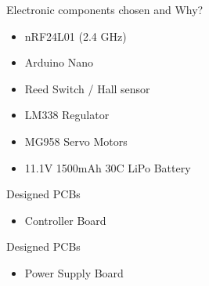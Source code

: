 \documentclass[10pt, a4paper]{beamer}
\begin{document}
\begin{frame}{Electronic components chosen and Why?}
\centering
\begin{itemize}
\setlength\itemsep{1em}
    \item nRF24L01 (2.4 GHz)
    \item Arduino Nano
    \item Reed Switch / Hall sensor
    \item LM338 Regulator
    \item MG958 Servo Motors
    \item 11.1V 1500mAh 30C LiPo Battery
    
    \end{itemize}
\end{frame}

\begin{frame}{Designed PCBs}
\begin{itemize}
    \item Controller Board
    \end{itemize}
\centering
{}	
\end{frame}

\begin{frame}{Designed PCBs}
\begin{itemize}
    \item Power Supply Board
    \end{itemize}
\centering
{}	
\end{frame}
\end{document}
